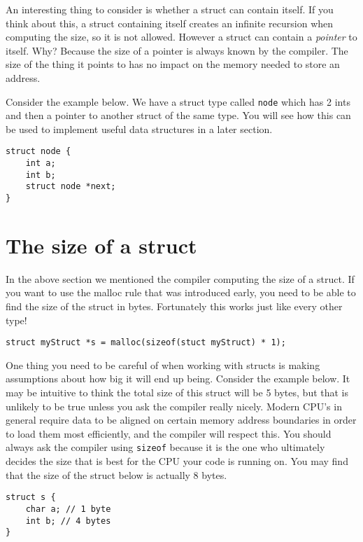 An interesting thing to consider is whether a struct can contain itself.
If you think about this, a struct containing itself creates an infinite recursion when computing the size, so it is not allowed.
However a struct can contain a \emph{pointer} to itself.
Why?
Because the size of a pointer is always known by the compiler.
The size of the thing it points to has no impact on the memory needed to store an address.

Consider the example below.
We have a struct type called \texttt{node} which has 2 ints and then a pointer to another struct of the same type.
You will see how this can be used to implement useful data structures in a later section.

\begin{lstlisting}
struct node {
    int a;
    int b;
    struct node *next;
}
\end{lstlisting}

\section{The size of a struct}

In the above section we mentioned the compiler computing the size of a struct.
If you want to use the malloc rule that was introduced early, you need to be able to find the size of the struct in bytes.
Fortunately this works just like every other type!

\begin{lstlisting}[numbers=none,frame=none]
struct myStruct *s = malloc(sizeof(stuct myStruct) * 1);
\end{lstlisting}

One thing you need to be careful of when working with structs is making assumptions about how big it will end up being.
Consider the example below.
It may be intuitive to think the total size of this struct will be 5 bytes, but that is unlikely to be true unless you ask the compiler really nicely.
Modern CPU's in general require data to be aligned on certain memory address boundaries in order to load them most efficiently, and the compiler will respect this.
You should always ask the compiler using \texttt{sizeof} because it is the one who ultimately decides the size that is best for the CPU your code is running on.
You may find that the size of the struct below is actually 8 bytes.

\begin{lstlisting}
struct s {
    char a; // 1 byte
    int b; // 4 bytes
}
\end{lstlisting}


